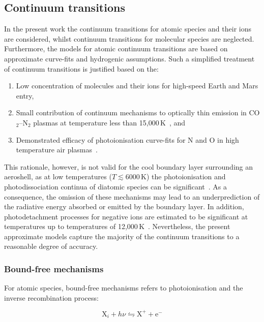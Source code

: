 \subsection{Continuum transitions}
\label{sec:continuum_transitions}

In the present work the continuum transitions for atomic species and their ions are considered, whilst continuum transitions for molecular species are neglected.
Furthermore, the models for atomic continuum transitions are based on approximate curve-fits and hydrogenic assumptions.
Such a simplified treatment of continuum transitions is justified based on the:

\begin{enumerate}
 \item Low concentration of molecules and their ions for high-speed Earth and Mars entry, 
 \item Small contribution of continuum mechanisms to optically thin emission in CO$_2$--N$_2$ plasmas at temperature less than 15,000\,K~\cite{BRP+2009}, and
 \item Demonstrated efficacy of photoionisation curve-fits for N and O in high temperature air plasmas~\cite{JHS2008a}.
\end{enumerate}

This rationale, however, is not valid for the cool boundary layer surrounding an aeroshell, as at low temperatures ($T\lesssim 6000$\,K) the photoionisation and photodissociation continua of diatomic species can be significant~\cite{CDP+2003,BRP+2009}.
As a consequence, the omission of these mechanisms may lead to an underprediction of the radiative energy absorbed or emitted by the boundary layer.
In addition, photodetachment processes for negative ions are estimated to be significant at temperatures up to temperatures of 12,000\,K~\cite{CDP+2003}.
Nevertheless, the present approximate models capture the majority of the continuum transitions to a reasonable degree of accuracy.


\subsubsection{Bound-free mechanisms}

For atomic species, bound-free mechanisms refers to photoionisation and the inverse recombination process:

\begin{equation}
 \text{X}_i + h \nu \leftrightharpoons \text{X}^+ + \text{e}^-
\end{equation}

